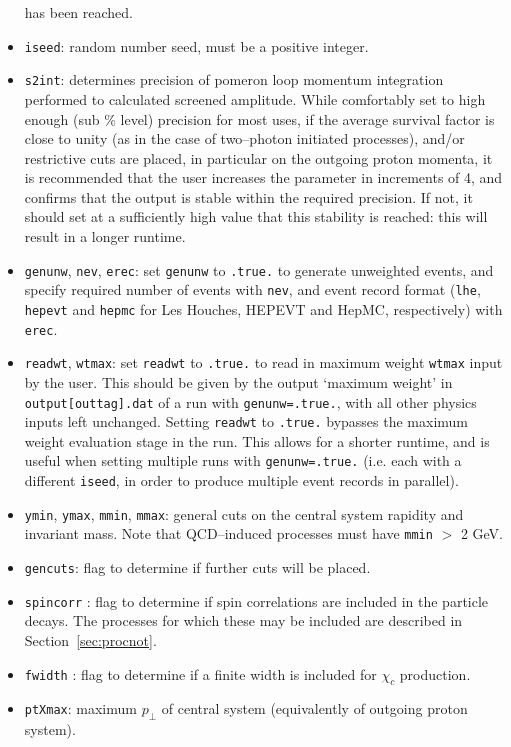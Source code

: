 \documentclass[12pt]{article}
\begin{document}
\begin{itemize}
has been reached.
\item \texttt{iseed}: random number seed, must be a positive integer.
\item \texttt{s2int}: determines precision of pomeron loop momentum integration performed to calculated screened 
amplitude. While comfortably set to high enough (sub \% level) precision for most uses, if the average survival factor
 is close to unity (as in the case of two--photon initiated processes), and/or restrictive cuts are placed, in 
 particular on the outgoing proton momenta, it is recommended that the user increases the parameter in increments of 4,
  and confirms that the output is stable within the required precision. If not, it should set at a sufficiently high 
  value that this stability is reached: this will result in a longer runtime.
\item \texttt{genunw}, \texttt{nev}, \texttt{erec}: set \texttt{genunw} to \texttt{.true.} to generate unweighted events,
 and specify required number of events with \texttt{nev}, and event record format (\texttt{lhe}, \texttt{hepevt} and 
 \texttt{hepmc} for Les Houches, HEPEVT and HepMC, respectively) with \texttt{erec}.
\item \texttt{readwt}, \texttt{wtmax}: set \texttt{readwt} to \texttt{.true.} to read in maximum weight \texttt{wtmax} 
input by the user. This should be given by the output `maximum weight' in  \texttt{output[outtag].dat} of a run with 
\texttt{genunw=.true.}, with all other physics inputs left unchanged. Setting \texttt{readwt} to \texttt{.true.} bypasses 
the maximum weight evaluation stage in the run. This allows for a shorter runtime, and is useful when setting multiple runs 
with \texttt{genunw=.true.} (i.e. each with a different \texttt{iseed}, in order to produce multiple event records in parallel).
\item \texttt{ymin}, \texttt{ymax}, \texttt{mmin}, \texttt{mmax}: general cuts on the central system rapidity and invariant
 mass. Note that QCD--induced processes must have \texttt{mmin} $>$ 2 GeV.
\item \texttt{gencuts}: flag to determine if further cuts will be placed.
\item \texttt{spincorr} : flag to determine if spin correlations are included in the particle decays. The processes for 
which these may be included are described in Section~\ref{sec:procnot}.
\item \texttt{fwidth} : flag to determine if a finite width is included for $\chi_c$ production.
\item \texttt{ptXmax}: maximum $p_\perp$ of central system (equivalently of outgoing proton system).

\end{itemize}
\end{document}
